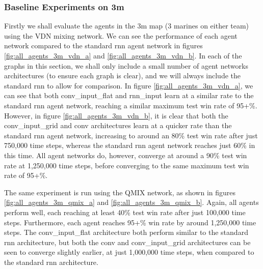 \subsubsection{Baseline Experiments on 3m}

Firstly we shall evaluate the agents in the 3m map (3 marines on either team) using the VDN mixing network. We can see the performance of each agent network compared to the standard rnn agent network in figures \ref{fig:all_agents_3m_vdn_a} and \ref{fig:all_agents_3m_vdn_b}. In each of the graphs in this section, we shall only include a small number of agent networks architectures (to ensure each graph is clear), and we will always include the standard rnn to allow for comparison. In figure \ref{fig:all_agents_3m_vdn_a}, we can see that both conv\_input\_flat and rnn\_input learn at a similar rate to the standard rnn agent network, reaching a similar maximum test win rate of 95+\%. However, in figure \ref{fig:all_agents_3m_vdn_b}, it is clear that both the conv\_input\_grid and conv architectures learn at a quicker rate than the standard rnn agent network, increasing to around an 80\% test win rate after just 750,000 time steps, whereas the standard rnn agent network reaches just 60\% in this time. All agent networks do, however, converge at around a 90\% test win rate at 1,250,000 time steps, before converging to the same maximum test win rate of 95+\%.

The same experiment is run using the QMIX network, as shown in figures \ref{fig:all_agents_3m_qmix_a} and \ref{fig:all_agents_3m_qmix_b}. Again, all agents perform well, each reaching at least 40\% test win rate after just 100,000 time steps. Furthermore, each agent reaches 95+\% win rate by around 1,250,000 time steps. The conv\_input\_flat architecture both perform similar to the standard rnn architecture, but both the conv and conv\_input\_grid architectures can be seen to converge slightly earlier, at just 1,000,000 time steps, when compared to the standard rnn architecture.

